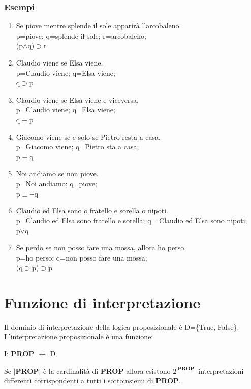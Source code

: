 \documentclass[../main.tex]{subfiles}
\begin{document}
    \subsubsection{Esempi}
    \begin{enumerate}
        \item Se piove mentre splende il sole apparirà l'arcobaleno.\\
            p=piove; q=splende il sole; r=arcobaleno;\\
            (p$\land$q)$\supset$r
        \item Claudio viene se Elsa viene.\\
            p=Claudio viene; q=Elsa viene;\\
            q$\supset$p
        \item Claudio viene se Elsa viene e viceversa.\\
            p=Claudio viene; q=Elsa viene;\\
            q$\equiv$p
        \item Giacomo viene se e solo se Pietro resta a casa.\\
            p=Giacomo viene; q=Pietro sta a casa;\\
            p$\equiv$q
        \item Noi andiamo se non piove.\\
            p=Noi andiamo; q=piove;\\
            p$\equiv \lnot$q
        \item Claudio ed Elsa sono o fratello e sorella o nipoti.\\
            p=Claudio ed Elsa sono fratello e sorella; q= Claudio ed Elsa sono nipoti;\\
            p$\lor$q
        \item Se perdo se non posso fare una mossa, allora ho perso.\\
            p=ho perso; q=non posso fare una mossa;\\
            (q$\supset$p)$\supset$p
    \end{enumerate}

    \section{Funzione di interpretazione}
    Il dominio di interpretazione della logica proposizionale è D=\{True, False\}.\\
    L'interpretazione proposizionale è una funzione:
    \begin{center}
        I: \textbf{PROP} $\to$ D
    \end{center}
    Se $|$\textbf{PROP}$|$ è la cardinalità di \textbf{PROP} allora esistono $2^{|\textbf{PROP}|}$ interpretazioni differenti corrispondenti a tutti i sottoinsiemi di \textbf{PROP}.
\end{document}
